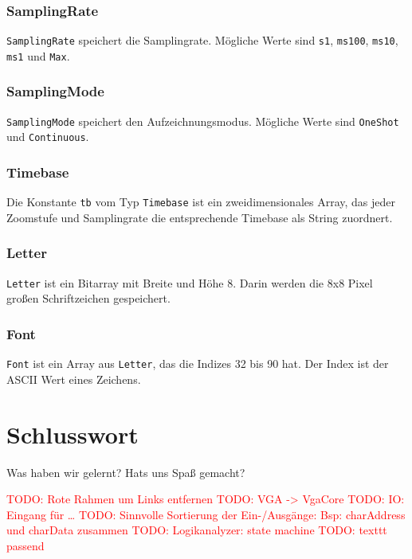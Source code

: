 \documentclass[IN,ngerman,utf8,12pt]{tumbook}
\newcommand\todo[1]{\textcolor{red}{TODO: #1}}
\begin{document}
\subsection{SamplingRate}
\label{kap:samplingrate}
\texttt{SamplingRate} speichert die Samplingrate.
Mögliche Werte sind \texttt{s1}, \texttt{ms100}, \texttt{ms10}, \texttt{ms1} und \texttt{Max}.

\subsection{SamplingMode}
\label{kap:samplingmode}
\texttt{SamplingMode} speichert den Aufzeichnungsmodus.
Mögliche Werte sind \texttt{OneShot} und \texttt{Continuous}.

\subsection{Timebase}
\label{kap:timebase}
Die Konstante \texttt{tb} vom Typ \texttt{Timebase} ist ein zweidimensionales Array, das jeder Zoomstufe und Samplingrate die entsprechende Timebase als String zuordnert.

\subsection{Letter}
\label{kap:letter}
\texttt{Letter} ist ein Bitarray mit Breite und Höhe 8.
Darin werden die 8x8 Pixel großen Schriftzeichen gespeichert.

\subsection{Font}
\label{kap:font}
\texttt{Font} ist ein Array aus \texttt{Letter}, das die Indizes 32 bis 90 hat.
Der Index ist der ASCII Wert eines Zeichens.

\chapter{Schlusswort}
Was haben wir gelernt? Hats uns Spaß gemacht?

\todo{Rote Rahmen um Links entfernen}
\todo{VGA -> VgaCore}
\todo{IO: Eingang für \ldots}
\todo{Sinnvolle Sortierung der Ein-/Ausgänge: Bsp: charAddress und charData zusammen}
\todo{Logikanalyzer: state machine}
\todo{texttt passend}


\clearpage
\appendix%
\listoffigures%
\end{document}
